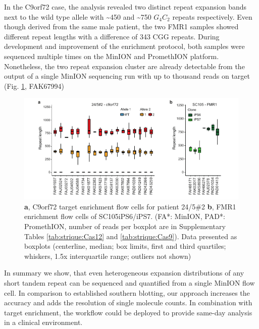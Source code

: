 In the C9orf72 case, the analysis revealed two distinct repeat expansion bands next to the wild type allele with \textasciitilde450 and \textasciitilde750 $ G_{4}C_{2} $ repeats respectively. Even though derived from the same male patient, the two FMR1 samples showed different repeat lengths with a difference of 343 CGG repeats. During development and improvement of the enrichment protocol, both samples were sequenced multiple times on the MinION and PromethION platform. Nonetheless, the two repeat expansion cluster are already detectable from the output of a single MinION sequencing run with up to thousand reads on target (Fig. \ref{fig:strique:count_experiments}, FAK67994)


\begin{figure}[h]
    \centering
    \includegraphics[width=1.0\textwidth]{figures/strique/count_experiments.pdf}
    \captionsetup{format=plain}
    \caption[Repeat count cluster stability over experiments]{\textbf{a}, C9orf72 target enrichment flow cells for patient 24/5\#2 \textbf{b}, FMR1 enrichment flow cells of SC105iPS6/iPS7. (FA*: MinION, PAD*: PromethION, number of reads per boxplot are in Supplementary Tables \ref{tab:strique:Cas12} and \ref{tab:strique:Cas9}). Data presented as boxplots (centerline, median; box limits, first and third quartiles; whiskers, 1.5x interquartile range; outliers not shown)}
    \label{fig:strique:count_experiments}
\end{figure}

In summary we show, that even heterogeneous expansion distributions of any short tandem repeat can be sequenced and quantified from a single MinION flow cell. In comparison to established southern blotting, our approach increases the accuracy and adds the resolution of single molecule counts. In combination with target enrichment, the workflow could be deployed to provide same-day analysis in a clinical environment.




